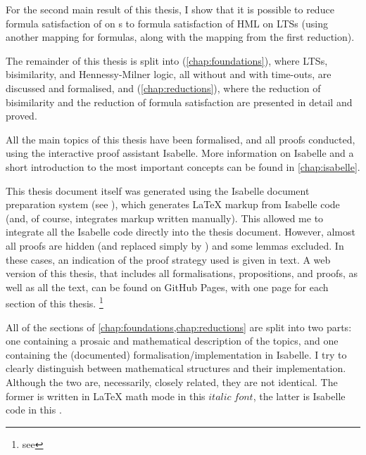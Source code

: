 \begin{isabellebody}
\begin{isamarkuptext}
For the second main result of this thesis, I show that it is possible to reduce formula satisfaction of \HMLt{} on \LTSt{}s to formula satisfaction of HML on LTSs (using another mapping for formulas, along with the mapping from the first reduction).
\newpage%
\end{isamarkuptext}\isamarkuptrue%
%
\isadelimdocument
%
\endisadelimdocument
%
\isatagdocument
%
\isamarkuptrue%
%
\endisatagdocument
{\isafolddocument}%
%
\isadelimdocument
%
\endisadelimdocument
%
\begin{isamarkuptext}%
The remainder of this thesis is split into  (\cref{chap:foundations}), where LTSs, bisimilarity, and Hennessy-Milner logic, all without and with time-outs, are discussed and formalised, and  (\cref{chap:reductions}), where the reduction of bisimilarity and the reduction of formula satisfaction are presented in detail and proved.

All the main topics of this thesis have been formalised, and all proofs conducted, using the interactive proof assistant Isabelle. More information on Isabelle and a short introduction to the most important concepts can be found in \cref{chap:isabelle}.

This thesis document itself was generated using the Isabelle document preparation system (see \cite{isa_system}), which generates \LaTeX{} markup from Isabelle code (and, of course, integrates markup written manually). This allowed me to integrate all the Isabelle code directly into the thesis document.
However, almost all proofs are hidden (and replaced simply by \isa{{\isasymproof}}) and some lemmas excluded. In these cases, an indication of the proof strategy used is given in text. A web version of this thesis, that includes all formalisations, propositions, and proofs, as well as all the text, can be found on GitHub Pages, with one page for each section of this thesis.%
\footnote{see }

All of the sections of \cref{chap:foundations,chap:reductions} are split into two parts: one containing a prosaic and mathematical description of the topics, and one containing the (documented) formalisation/implementation in Isabelle. I try to clearly distinguish between mathematical structures and their implementation. Although the two are, necessarily, closely related, they are not identical. The former is written in \LaTeX{} math mode in this $italic\;font$, the latter is Isabelle code in this .%
\end{isamarkuptext}\isamarkuptrue%
%
\isadelimtheory
%
\endisadelimtheory
%
\isatagtheory
%
\endisatagtheory
{\isafoldtheory}%
%
\isadelimtheory
%
\endisadelimtheory
%
\end{isabellebody}%
